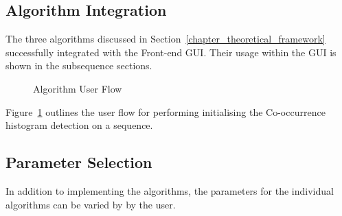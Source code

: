 \subsection{Algorithm Integration}
The three algorithms discussed in Section~\ref{chapter_theoretical_framework}
successfully integrated with the Front-end GUI. Their usage within the GUI is
shown in the subsequence sections.

\begin{figure}
    \caption{Algorithm User Flow\label{fig:gui_CHD}}
\end{figure}

Figure~\ref{fig:gui_CHD} outlines the user flow for performing initialising the
Co-occurrence histogram detection on a sequence.


\subsection{Parameter Selection}
In addition to implementing the algorithms, the parameters for the individual
algorithms can be varied by by the user.



